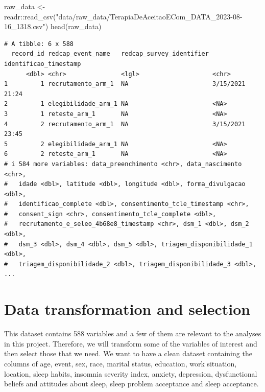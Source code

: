 \documentclass[
  letterpaper,
  DIV=11,
  numbers=noendperiod]{scrreprt}
\newenvironment{Shaded}{\begin{snugshade}}{\end{snugshade}}
\newcommand{\FunctionTok}[1]{\textcolor[rgb]{0.28,0.35,0.67}{#1}}
\newcommand{\NormalTok}[1]{\textcolor[rgb]{0.00,0.23,0.31}{#1}}
\newcommand{\OtherTok}[1]{\textcolor[rgb]{0.00,0.23,0.31}{#1}}
\newcommand{\SpecialCharTok}[1]{\textcolor[rgb]{0.37,0.37,0.37}{#1}}
\newcommand{\StringTok}[1]{\textcolor[rgb]{0.13,0.47,0.30}{#1}}
\begin{document}
\begin{Shaded}
\begin{Highlighting}[]
\NormalTok{raw\_data }\OtherTok{\textless{}{-}}\NormalTok{ readr}\SpecialCharTok{::}\FunctionTok{read\_csv}\NormalTok{(}\StringTok{"data/raw\_data/TerapiaDeAceitaoECom\_DATA\_2023{-}08{-}16\_1318.csv"}\NormalTok{)}
\FunctionTok{head}\NormalTok{(raw\_data)}
\end{Highlighting}
\end{Shaded}

\begin{verbatim}
# A tibble: 6 x 588
  record_id redcap_event_name   redcap_survey_identifier identificao_timestamp
      <dbl> <chr>               <lgl>                    <chr>                
1         1 recrutamento_arm_1  NA                       3/15/2021 21:24      
2         1 elegibilidade_arm_1 NA                       <NA>                 
3         1 reteste_arm_1       NA                       <NA>                 
4         2 recrutamento_arm_1  NA                       3/15/2021 23:45      
5         2 elegibilidade_arm_1 NA                       <NA>                 
6         2 reteste_arm_1       NA                       <NA>                 
# i 584 more variables: data_preenchimento <chr>, data_nascimento <chr>,
#   idade <dbl>, latitude <dbl>, longitude <dbl>, forma_divulgacao <dbl>,
#   identificao_complete <dbl>, consentimento_tcle_timestamp <chr>,
#   consent_sign <chr>, consentimento_tcle_complete <dbl>,
#   recrutamento_e_seleo_4b68e8_timestamp <chr>, dsm_1 <dbl>, dsm_2 <dbl>,
#   dsm_3 <dbl>, dsm_4 <dbl>, dsm_5 <dbl>, triagem_disponibilidade_1 <dbl>,
#   triagem_disponibilidade_2 <dbl>, triagem_disponibilidade_3 <dbl>, ...
\end{verbatim}

\hypertarget{data-transformation-and-selection}{%
\section{Data transformation and
selection}\label{data-transformation-and-selection}}

This dataset contains 588 variables and a few of them are relevant to
the analyses in this project. Therefore, we will transform some of the
variables of interest and then select those that we need. We want to
have a clean dataset containing the columns of age, event, sex, race,
marital status, education, work situation, location, sleep habits,
insomnia severity index, anxiety, depression, dysfunctional beliefs and
attitudes about sleep, sleep problem acceptance and sleep acceptance.
\end{document}
